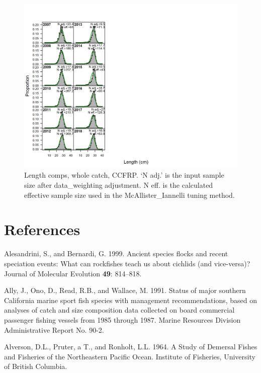 \documentclass[12pt,]{article}
\begin{document}
\begin{figure}
\centering
\includegraphics{./r4ss/plots_mod1/comp_lenfit_flt9mkt0.png}
\caption{Length comps, whole catch, CCFRP. `N adj.' is the input sample
size after data\_weighting adjustment. N eff. is the calculated
effective sample size used in the McAllister\_Iannelli tuning method.
\label{fig:mod1_7_comp_lenfit_flt9mkt0}}
\end{figure}

\newpage

\color{black}

\section*{References}\label{references}

\renewcommand{\thepage}{}

\hypertarget{refs}{}
\hypertarget{ref-Alesandrini1999}{}
Alesandrini, S., and Bernardi, G. 1999. Ancient species flocks and
recent speciation events: What can rockfishes teach us about cichlids
(and vice-versa)? Journal of Molecular Evolution \textbf{49}: 814--818.

\hypertarget{ref-Ally1991}{}
Ally, J., Ono, D., Read, R.B., and Wallace, M. 1991. Status of major
southern California marine sport fish species with management
recommendations, based on analyses of catch and size composition data
collected on board commercial passenger fishing vessels from 1985
through 1987. Marine Resources Division Administrative Report No. 90-2.

\hypertarget{ref-Alverson1964}{}
Alverson, D.L., Pruter, a T., and Ronholt, L.L. 1964. A Study of
Demersal Fishes and Fisheries of the Northeastern Pacific Ocean.
Institute of Fisheries, University of British Columbia.
\end{document}
